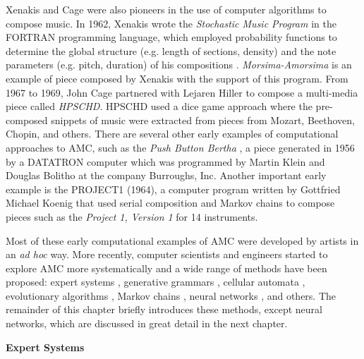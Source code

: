 Xenakis and Cage were also pioneers in the use of computer algorithms to compose music. In 1962, Xenakis wrote the \textit{Stochastic Music Program} in the FORTRAN programming language, which employed probability functions to determine the global structure (e.g. length of sections, density) and the note parameters (e.g. pitch, duration) of his compositions \cite{luque2009stochastic}. \textit{Morsima-Amorsima} is an example of piece composed by Xenakis with the support of this program. From 1967 to 1969, John Cage partnered with Lejaren Hiller to compose a multi-media piece called \textit{HPSCHD}. HPSCHD used a dice game approach where the pre-composed snippets of music were extracted from pieces from Mozart, Beethoven, Chopin, and others.  There are several other early examples of computational approaches to AMC, such as the \textit{Push Button Bertha} \cite{ames1987automated}, a piece generated in 1956 by a DATATRON computer which was programmed by Martin Klein and Douglas Bolitho at the company Burroughs, Inc. Another important early example is the PROJECT1 (1964), a computer program written by Gottfried Michael Koenig that used serial composition and Markov chains to compose pieces such as the \textit{Project 1, Version 1} for 14 instruments.

Most of these early computational examples of AMC were developed by artists in an \textit{ad hoc} way. More recently, computer scientists and engineers started to explore AMC more systematically and a wide range of methods have been proposed: expert systems \cite{gill1963technique}, generative grammars \cite{cope1989experiments}, cellular automata \cite{miranda1993cellular}, evolutionary algorithms \cite{horner1991genetic}, Markov chains \cite{hild1992harmonet}, neural networks \cite{todd1989connectionist}, and others. The remainder of this chapter briefly introduces these methods, except neural networks, which are discussed in great detail in the next chapter.

\vspace{0.1in}
\noindent
\textbf{Expert Systems}

